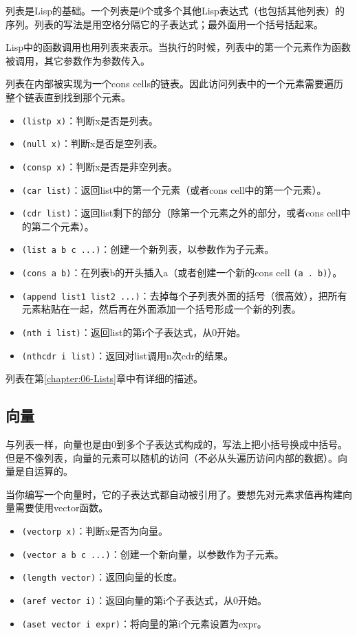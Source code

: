 列表是Lisp的基础。一个列表是0个或多个其他Lisp表达式（也包括其他列表）的序列。列表的写法是用空格分隔它的子表达式；最外面用一个括号括起来。

Lisp中的函数调用也用列表来表示。当执行的时候，列表中的第一个元素作为函数被调用，其它参数作为参数传入。

列表在内部被实现为一个cons cells的链表。因此访问列表中的一个元素需要遍历整个链表直到找到那个元素。

\begin{itemize}
  \item \texttt{(listp x)}：判断x是否是列表。
  \item \texttt{(null x)}：判断x是否是空列表。
  \item \texttt{(consp x)}：判断x是否是非空列表。
  \item \texttt{(car list)}：返回list中的第一个元素（或者cons cell中的第一个元素）。
  \item \texttt{(cdr list)}：返回list剩下的部分（除第一个元素之外的部分，或者cons cell中的第二个元素）。
  \item \texttt{(list a b c ...)}：创建一个新列表，以参数作为子元素。
  \item \texttt{(cons a b)}：在列表b的开头插入a（或者创建一个新的cons cell \texttt{(a . b)}）。
  \item \texttt{(append list1 list2 ...)}：去掉每个子列表外面的括号（很高效），把所有元素粘贴在一起，然后再在外面添加一个括号形成一个新的列表。
  \item \texttt{(nth i list)}：返回list的第i个子表达式，从0开始。
  \item \texttt{(nthcdr i list)}：返回对list调用n次cdr的结果。
\end{itemize}

列表在第\ref{chapter:06-Lists}章中有详细的描述。

\subsection{向量}
\label{section:B-Vectors}

与列表一样，向量也是由0到多个子表达式构成的，写法上把小括号换成中括号。但是不像列表，向量的元素可以随机的访问（不必从头遍历访问内部的数据）。向量是自运算的。

当你编写一个向量时，它的子表达式都自动被引用了。要想先对元素求值再构建向量需要使用vector函数。

\begin{itemize}
  \item \texttt{(vectorp x)}：判断x是否为向量。
  \item \texttt{(vector a b c ...)}：创建一个新向量，以参数作为子元素。
  \item \texttt{(length vector)}：返回向量的长度。
  \item \texttt{(aref vector i)}：返回向量的第i个子表达式，从0开始。
  \item \texttt{(aset vector i expr)}：将向量的第i个元素设置为expr。
\end{itemize}

